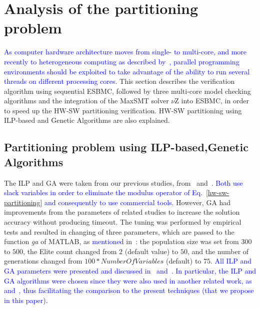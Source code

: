 \documentclass{doublecol-new}
\theoremstyle{TH}{
\newtheorem{lemma}{Lemma}
\newtheorem{theorem}[lemma]{Theorem}
\newtheorem{corrolary}[lemma]{Corrolary}
\newtheorem{conjecture}[lemma]{Conjecture}
\newtheorem{proposition}[lemma]{Proposition}
\newtheorem{claim}[lemma]{Claim}
\newtheorem{stheorem}[lemma]{Wrong Theorem}
\newtheorem{algorithm}{Algorithm}
}
\theoremstyle{THrm}{
\newtheorem{definition}{Definition}[section]
\newtheorem{question}{Question}[section]
\newtheorem{remark}{Remark}
\newtheorem{scheme}{Scheme}
}
\theoremstyle{THhit}{
\newtheorem{case}{Case}[section]
}
\begin{document}
\section{Analysis of the partitioning problem}
\label{Analysis-of-the-partitioning-problem-using-ESBMC}

\noindent \textcolor{blue}{As computer hardware architecture moves from single- to multi-core, and more recently to heterogeneous computing as described by~\cite{Mittal2015}, parallel programming environments should be exploited to take advantage of the ability to run several threads on different processing cores}. This section describes the verification algorithm using sequential ESBMC, followed by three multi-core model checking algorithms and the integration of the MaxSMT solver $\nu$Z into ESBMC, in order to speed up the HW-SW partitioning verification. HW-SW partitioning using ILP-based and Genetic Algorithms are also explained.

\subsection{Partitioning problem using ILP-based,Genetic Algorithms}
\label{ILPGA}

The ILP and GA were taken from our previous studies, from~\cite{Trindade2015} and~\cite{Trindade2016}. \textcolor{blue}{Both use slack variables in order to eliminate the modulus operator of Eq.~\eqref{hw-sw-partitioning} and consequently to use commercial tools.} However, GA had improvements from the parameters of related studies to increase the solution accuracy without producing timeout. The tuning was performed by empirical tests and resulted in changing of three parameters, which are passed to the function \textit{ga} of MATLAB, as \textcolor{blue}{mentioned} in~\cite{TheMathWorks2013}: the population size was set from $300$ to $500$, the Elite count changed from $2$ (default value) to $50$, and the number of generations changed from $100*NumberOfVariables$ (default) to $75$. \textcolor{blue}{All ILP and GA parameters were presented and discussed in~\cite{Trindade2015} and~\cite{Trindade2016}. In particular, the ILP and GA algorithms were chosen since they were also used in another related work, as~\cite{Arato2003} and~\cite{Mann2007}, thus facilitating the comparison to the present techniques (that we propose in this paper).}
\end{document}
